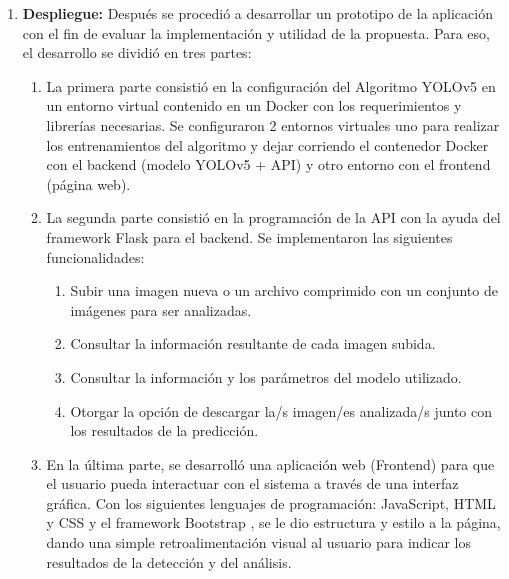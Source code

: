 \begin{enumerate}
    \item \textbf{Despliegue:} Después se procedió a desarrollar un prototipo de la aplicación con el fin de evaluar la implementación y utilidad de la propuesta. Para eso, el desarrollo se dividió en tres partes:
    \begin{enumerate}
        \item La primera parte consistió en la configuración del Algoritmo YOLOv5 en un entorno virtual contenido en un Docker con los requerimientos y librerías necesarias. Se configuraron 2 entornos virtuales uno para realizar los entrenamientos del algoritmo y dejar corriendo el contenedor Docker con el backend (modelo YOLOv5 + API) y otro entorno con el frontend (página web).
        \item La segunda parte consistió en la programación de la API con la ayuda del framework Flask \cite{flask} para el backend. Se implementaron las siguientes funcionalidades:
        \begin{enumerate}
            \item Subir una imagen nueva o un archivo comprimido con un conjunto de imágenes para ser analizadas.
            \item Consultar la información resultante de cada imagen subida.
            \item Consultar la información y los parámetros del modelo utilizado.
            \item Otorgar la opción de descargar la/s imagen/es analizada/s junto con los resultados de la predicción.
        \end{enumerate}
        \item En la última parte, se desarrolló una aplicación web (Frontend) para que el usuario pueda interactuar con el sistema a través de una interfaz gráfica. Con los siguientes lenguajes de programación: JavaScript, HTML y CSS y el framework Bootstrap \cite{bootstrap}, se le dio estructura y estilo a la página, dando una simple retroalimentación visual al usuario para indicar los resultados de la detección y del análisis.
    \end{enumerate}
\end{enumerate}
\newpage

